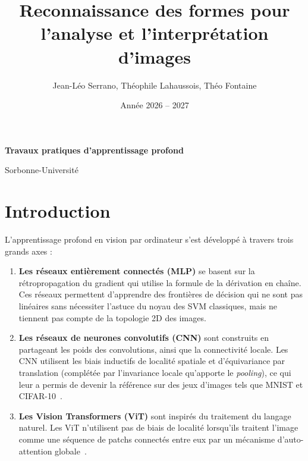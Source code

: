 \documentclass{report}
\title{Reconnaissance des formes pour l'analyse et l'interprétation d'images}
\author{Jean-Léo Serrano, Théophile Lahaussois, Théo Fontaine}
\date{Année 2026 -- 2027}
\begin{document}
\begin{titlepage}
    \centering

    \vspace*{\fill}
    \Huge \thetitle \par
    \vspace{2mm}
    \Large \textbf{Travaux pratiques d'apprentissage profond} \par
    \vspace{2mm}

    \Large \theauthor \par
    \vspace{2mm}
    \large \thedate \par

    \vfill

    \large Sorbonne-Université

\end{titlepage}

\tableofcontents
\newpage

\chapter*{Introduction}

\noindent
L'apprentissage profond en vision par ordinateur s'est développé à travers trois grands axes :
\begin{enumerate}
    \item \textbf{Les réseaux entièrement connectés (MLP)} se basent sur la rétropropagation du gradient qui utilise la formule de la dérivation en chaîne. Ces réseaux permettent d'apprendre des frontières de décision qui ne sont pas linéaires sans nécessiter l'astuce du noyau des SVM classiques, mais ne tiennent pas compte de la topologie 2D des images.
    \item \textbf{Les réseaux de neurones convolutifs (CNN)} sont construits en partageant les poids des convolutions, ainsi que la connectivité locale. Les CNN utilisent les biais inductifs de localité spatiale et d'équivariance par translation (complétée par l'invariance locale qu'apporte le \textit{pooling}), ce qui leur a permis de devenir la référence sur des jeux d'images tels que MNIST et CIFAR-10~\cite{lecun1998, krizhevsky2012}.
    \item \textbf{Les Vision Transformers (ViT)} sont inspirés du traitement du langage naturel. Les ViT n'utilisent pas de biais de localité lorsqu'ils traitent l'image comme une séquence de patchs connectés entre eux par un mécanisme d'auto-attention globale~\cite{dosovitskiy2021}.
\end{enumerate}
\end{document}
